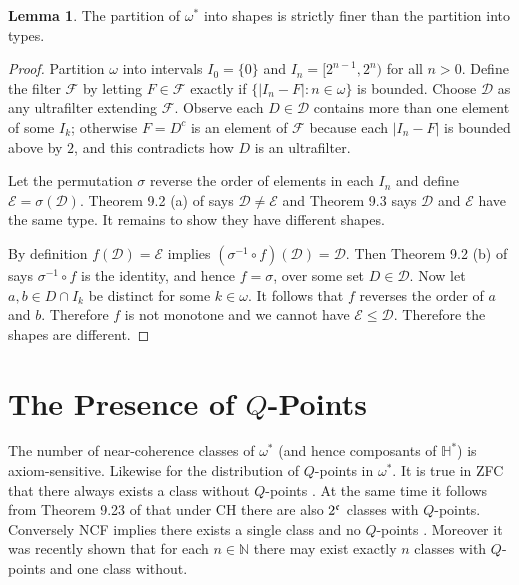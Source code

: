 \documentclass[12pt]{article}
\theoremstyle{plain}
\theoremstyle{definition}
\newtheorem{lemma}[theorem]{Lemma}
\newcommand{\si}{\ensuremath{\sigma}}
\newcommand{\W}{\ensuremath{\omega}}
\newcommand{\NN}{\ensuremath{\mathbb N}}
\newcommand{\HH}{\ensuremath{\mathbb H}}
\newcommand{\0}{\ensuremath{\varnothing}}
\newcommand{\cD}{\ensuremath{\mathcal D}}
\newcommand{\cF}{\ensuremath{\mathcal F}}
\newcommand{\cE}{\ensuremath{\mathcal E}}
\begin{document}
	\begin{lemma}\label{example}
		The partition of $\W^*$ into shapes is strictly finer than the partition into types.
	\end{lemma}
	
	\begin{proof}
		
		Partition $\W$ into intervals $I_0 = \{0\}$ and $I_n = [2^{n-1}, 2^{n})$ for all $n > 0$. Define the filter $\cF$ by
		letting $F \in \cF$ exactly if $\big \{|I_n-F| \colon n \in \W \big \}$ is bounded. Choose $\cD$ as any ultrafilter
		extending $\cF$. Observe each $D \in \cD$ contains more than one element of some $I_k$; 
		otherwise $F = D^c$ is an element of $\cF$ because each $|I_n-F|$ is bounded above by $2$, 
		and this contradicts how $D$ is an ultrafilter.
		
		
		Let the permutation $\sigma$ reverse the order of elements in each $I_n$ and define 
		$\cE = \si(\cD)$. Theorem 9.2 (a) of \cite{uff} says $\cD \ne \cE$ and Theorem 9.3 says $\cD$ and $\cE$ 
		have the same type. It remains to show they have different shapes.
		
		By definition $f(\cD) = \cE$ implies $(\si^{-1}\circ f)(\cD) = \cD$.
		Then Theorem 9.2 (b) of \cite{uff} says $\si^{-1}\circ f$ is the identity, and hence $f=\si$,
		over some set $D \in \cD$. Now let $a,b \in D \cap I_k$ be distinct for some $k \in \W$. 
		It follows that $f$ reverses the order of $a$ and $b$. Therefore $f$ is not monotone
		and we cannot have $\cE \le \cD$. Therefore the shapes are different.
	\end{proof}
	
	

	
	\section{The Presence of $Q$-Points}
	
	
	\noindent The number of near-coherence classes of $\W^*$ (and hence composants of $\HH^*$) is axiom-sensitive. Likewise for the distribution of $Q$-points in $\W^*$. It is true in ZFC that there always exists a class without $Q$-points \cite{RBOrder}. At the same time it follows from Theorem 9.23 of \cite{CSbook} that under CH there are also $2^{\frak c}$ classes with $Q$-points. Conversely NCF implies there exists a single class and no $Q$-points \cite{NCF1}. 
	Moreover it was recently shown \cite{FmNCC} that for each $n \in \NN$ there may exist exactly $n$ classes with $Q$-points and one class without.
	
\end{document}
